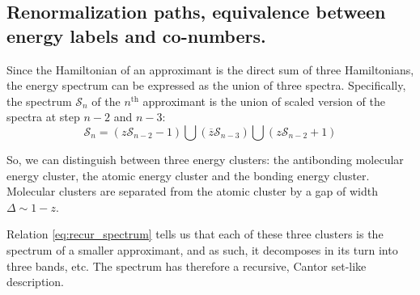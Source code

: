 \documentclass[aps,prl,preprint]{revtex4-1}
\newcommand{\zb}{\ensuremath{\overline{z}}}
\begin{document}
\subsection{Renormalization paths, equivalence between energy labels and co-numbers.}



Since the Hamiltonian of an approximant is the direct sum of three Hamiltonians, the energy spectrum can be expressed as the union of three spectra.
Specifically, the spectrum $\mathcal{S}_n$ of the $n^\text{th}$ approximant is the union of scaled version of the spectra at step $n-2$ and $n-3$:
\begin{equation}
\label{eq:recur_spectrum}
	\mathcal{S}_n = \left( z \mathcal{S}_{n-2} - 1 \right) \bigcup \left( \zb \mathcal{S}_{n-3} \right) \bigcup \left( z \mathcal{S}_{n-2} + 1 \right) 
\end{equation}

So, we can distinguish between three energy clusters: the antibonding molecular energy cluster, the atomic energy cluster and the bonding energy cluster. Molecular clusters are separated from the atomic cluster by a gap of width $\Delta \sim 1 - z$.

Relation \eqref{eq:recur_spectrum} tells us that each of these three clusters is the spectrum of a smaller approximant, and as such, it decomposes in its turn into three bands, etc.
The spectrum has therefore a recursive, Cantor set-like description.
\end{document}
